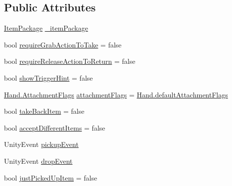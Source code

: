 \subsection*{Public Attributes}
\begin{DoxyCompactItemize}
\item 
\mbox{\hyperlink{class_valve_1_1_v_r_1_1_interaction_system_1_1_item_package}{Item\+Package}} \mbox{\hyperlink{class_valve_1_1_v_r_1_1_interaction_system_1_1_item_package_spawner_ac180c5e384db6629b334d6486e735d35}{\+\_\+item\+Package}}
\item 
bool \mbox{\hyperlink{class_valve_1_1_v_r_1_1_interaction_system_1_1_item_package_spawner_a00584c7086c9ecf9c07d0fcb012058ac}{require\+Grab\+Action\+To\+Take}} = false
\item 
bool \mbox{\hyperlink{class_valve_1_1_v_r_1_1_interaction_system_1_1_item_package_spawner_af4bd8f1d7a40de0808159fea06d25ff7}{require\+Release\+Action\+To\+Return}} = false
\item 
bool \mbox{\hyperlink{class_valve_1_1_v_r_1_1_interaction_system_1_1_item_package_spawner_ac5a26b402843f3584a1713aba51d6cf1}{show\+Trigger\+Hint}} = false
\item 
\mbox{\hyperlink{class_valve_1_1_v_r_1_1_interaction_system_1_1_hand_a61701f82b8f3fac8818954ec71804cb5}{Hand.\+Attachment\+Flags}} \mbox{\hyperlink{class_valve_1_1_v_r_1_1_interaction_system_1_1_item_package_spawner_af9263180785d93503cd8b0bc05d4c2ea}{attachment\+Flags}} = \mbox{\hyperlink{class_valve_1_1_v_r_1_1_interaction_system_1_1_hand_a836a6cb55d2514dbed680981dfcc5505}{Hand.\+default\+Attachment\+Flags}}
\item 
bool \mbox{\hyperlink{class_valve_1_1_v_r_1_1_interaction_system_1_1_item_package_spawner_aefc74e62c39dfc6c5fd646dd8d18da61}{take\+Back\+Item}} = false
\item 
bool \mbox{\hyperlink{class_valve_1_1_v_r_1_1_interaction_system_1_1_item_package_spawner_a882bfe6110001f43a76f2d35ffedb47f}{accept\+Different\+Items}} = false
\item 
Unity\+Event \mbox{\hyperlink{class_valve_1_1_v_r_1_1_interaction_system_1_1_item_package_spawner_a5763bfcaa5ba69f9f0d178dde7cf11c8}{pickup\+Event}}
\item 
Unity\+Event \mbox{\hyperlink{class_valve_1_1_v_r_1_1_interaction_system_1_1_item_package_spawner_adffe0a0db412218c6f2809234b4a2569}{drop\+Event}}
\item 
bool \mbox{\hyperlink{class_valve_1_1_v_r_1_1_interaction_system_1_1_item_package_spawner_a32ac8e835d0264a34aecddee4c52f3d4}{just\+Picked\+Up\+Item}} = false
\end{DoxyCompactItemize}
